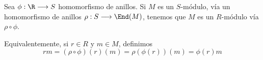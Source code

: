 \begin{prop}
  Sea \(\phi:\R\longrightarrow S\) homomorfismo de anillos. Si \(M\)
  es un \(S\)-módulo, vía un homomorfismo de anillos \(\rho:
  S\longrightarrow\End(M)\), tenemos que \(M\) es un
  \(R\)-módulo vía \(\rho\circ\phi\).

  Equivalentemente, si \(r\in R\) y \(m\in M\), definimos
  \[
    rm=(\rho\circ\phi)(r)(m)=\rho(\phi(r))(m)=\phi(r)m
  \]
\end{prop}

